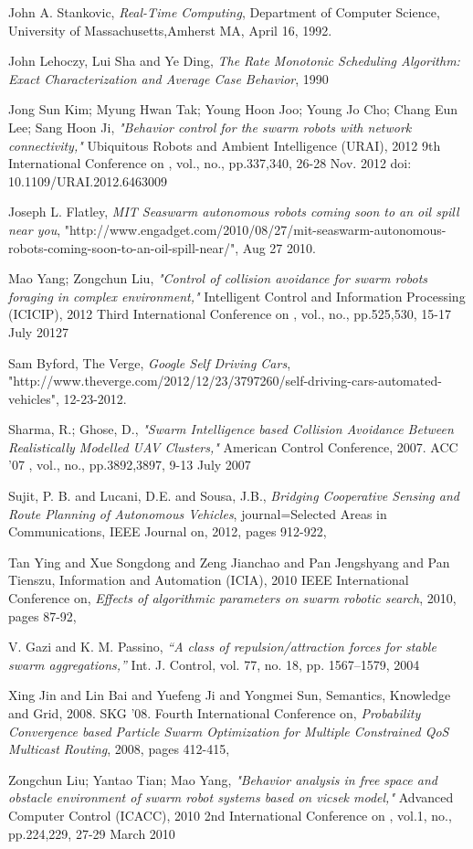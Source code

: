 \documentclass[journal]{IEEEtran}
\begin{document}
\begin{thebibliography}{1}
John A. Stankovic, \emph{Real-Time Computing}, Department of Computer Science, University of Massachusetts,Amherst MA, April 16, 1992.

John Lehoczy, Lui Sha and Ye Ding,
\emph{The Rate Monotonic Scheduling Algorithm: Exact Characterization and Average Case Behavior},
1990

Jong Sun Kim; Myung Hwan Tak; Young Hoon Joo; Young Jo Cho; Chang Eun Lee; Sang Hoon Ji, \emph{"Behavior control for the swarm robots with network connectivity,"} Ubiquitous Robots and Ambient Intelligence (URAI), 2012 9th International Conference on , vol., no., pp.337,340, 26-28 Nov. 2012
doi: 10.1109/URAI.2012.6463009

Joseph L. Flatley, \emph{MIT Seaswarm autonomous robots coming soon to an oil spill near you},
"http://www.engadget.com/2010/08/27/mit-seaswarm-autonomous-robots-coming-soon-to-an-oil-spill-near/", Aug 27 2010.

Mao Yang; Zongchun Liu, \emph{"Control of collision avoidance for swarm robots foraging in complex environment,"} Intelligent Control and Information Processing (ICICIP), 2012 Third International Conference on , vol., no., pp.525,530, 15-17 July 20127

Sam Byford, The Verge, \emph{Google Self Driving Cars}, "http://www.theverge.com/2012/12/23/3797260/self-driving-cars-automated-vehicles", 12-23-2012.

Sharma, R.; Ghose, D., \emph{"Swarm Intelligence based Collision Avoidance Between Realistically Modelled UAV Clusters,"} American Control Conference, 2007. ACC '07 , vol., no., pp.3892,3897, 9-13 July 2007

Sujit, P. B. and Lucani, D.E. and Sousa, J.B.,
\emph{Bridging Cooperative Sensing and Route Planning of Autonomous Vehicles}, journal=Selected Areas in Communications, IEEE Journal on,
2012, pages 912-922,

Tan Ying and Xue Songdong and Zeng Jianchao and Pan Jengshyang and Pan Tienszu,
Information and Automation (ICIA), 2010 IEEE International Conference on, \emph{Effects of algorithmic parameters on swarm robotic search},
2010, pages 87-92,

V. Gazi and K. M. Passino, \emph{“A class of repulsion/attraction forces for stable swarm aggregations,”} Int. J. Control, vol. 77, no. 18, pp.  1567–1579, 2004

Xing Jin and Lin Bai and Yuefeng Ji and Yongmei Sun,
Semantics, Knowledge and Grid, 2008. SKG '08. Fourth International Conference on, \emph{Probability Convergence based Particle Swarm Optimization for Multiple Constrained QoS Multicast Routing},
2008, pages 412-415,

Zongchun Liu; Yantao Tian; Mao Yang, \emph{"Behavior analysis in free space and obstacle environment of swarm robot systems based on vicsek model,"} Advanced Computer Control (ICACC), 2010 2nd International Conference on , vol.1, no., pp.224,229, 27-29 March 2010

\end{thebibliography}
\end{document}
